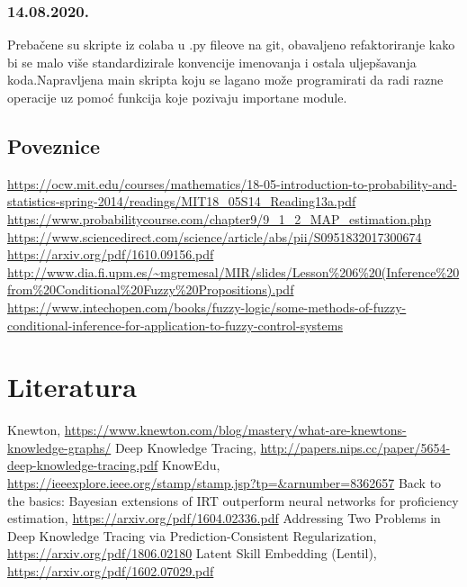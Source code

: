\documentclass[times, utf8,projekt]{fer}
\begin{document}
		\subsection{14.08.2020.}
			Prebačene su skripte iz colaba u .py fileove na git, obavaljeno refaktoriranje kako bi se malo više standardizirale konvencije imenovanja i ostala uljepšavanja koda.Napravljena main skripta koju se lagano može programirati da radi razne operacije uz pomoć funkcija koje pozivaju importane module.
	\section{Poveznice}
	\url{https://ocw.mit.edu/courses/mathematics/18-05-introduction-to-probability-and-statistics-spring-2014/readings/MIT18_05S14_Reading13a.pdf}\newline
	\url{https://www.probabilitycourse.com/chapter9/9_1_2_MAP_estimation.php}\newline
	\url{https://www.sciencedirect.com/science/article/abs/pii/S0951832017300674}\newline
	\url{https://arxiv.org/pdf/1610.09156.pdf}\newline
	\url{http://www.dia.fi.upm.es/~mgremesal/MIR/slides/Lesson\%206\%20(Inference\%20from\%20Conditional\%20Fuzzy\%20Propositions).pdf}\newline
	\url{https://www.intechopen.com/books/fuzzy-logic/some-methods-of-fuzzy-conditional-inference-for-application-to-fuzzy-control-systems}
	
	
%
%
\chapter{Literatura}
\renewcommand{\bibsection}{}
\begin{thebibliography}{9}
	
	 Knewton, \url{https://www.knewton.com/blog/mastery/what-are-knewtons-knowledge-graphs/}
	 Deep Knowledge Tracing, \url{ http://papers.nips.cc/paper/5654-deep-knowledge-tracing.pdf}
	 KnowEdu, \url{ https://ieeexplore.ieee.org/stamp/stamp.jsp?tp=&arnumber=8362657}
	 Back to the basics: Bayesian extensions of IRT outperform
	neural networks for proficiency estimation, \url{https://arxiv.org/pdf/1604.02336.pdf}
	 Addressing Two Problems in Deep Knowledge Tracing via
	Prediction-Consistent Regularization, \url{https://arxiv.org/pdf/1806.02180}
	 Latent Skill Embedding (Lentil), \url{https://arxiv.org/pdf/1602.07029.pdf}
	
\end{thebibliography}
\end{document}

